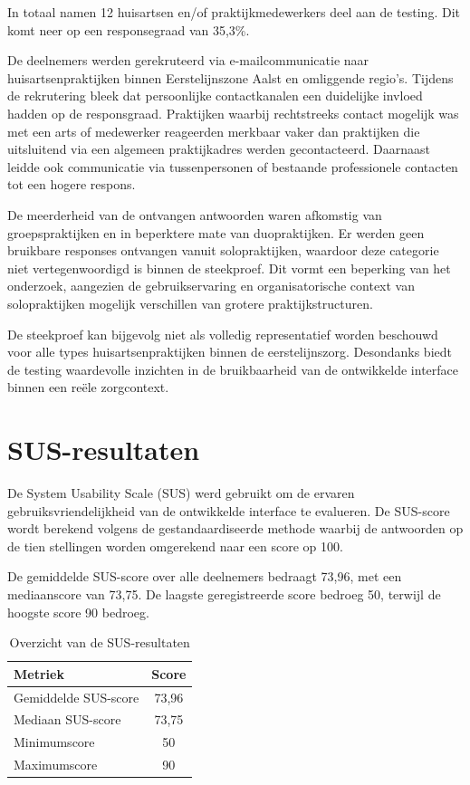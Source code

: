 In totaal namen 12 huisartsen en/of praktijkmedewerkers deel aan de testing. 
Dit komt neer op een responsegraad van 35,3\%.
\medskip

De deelnemers werden gerekruteerd via e-mailcommunicatie naar huisartsenpraktijken binnen Eerstelijnszone Aalst en omliggende regio's. 
Tijdens de rekrutering bleek dat persoonlijke contactkanalen een duidelijke invloed hadden op de responsgraad. 
Praktijken waarbij rechtstreeks contact mogelijk was met een arts of medewerker reageerden merkbaar vaker dan praktijken die uitsluitend via een algemeen praktijkadres werden gecontacteerd. 
Daarnaast leidde ook communicatie via tussenpersonen of bestaande professionele contacten tot een hogere respons.
\medskip

De meerderheid van de ontvangen antwoorden waren afkomstig van groepspraktijken en in beperktere mate van duopraktijken. 
Er werden geen bruikbare responses ontvangen vanuit solopraktijken, waardoor deze categorie niet vertegenwoordigd is binnen de steekproef. 
Dit vormt een beperking van het onderzoek, aangezien de gebruikservaring en organisatorische context van solopraktijken mogelijk verschillen van grotere praktijkstructuren.
\medskip

De steekproef kan bijgevolg niet als volledig representatief worden beschouwd voor alle types huisartsenpraktijken binnen de eerstelijnszorg. 
Desondanks biedt de testing waardevolle inzichten in de bruikbaarheid van de ontwikkelde interface binnen een reële zorgcontext.

\section{SUS-resultaten}
\label{sec:susresultaten}

De System Usability Scale (SUS) werd gebruikt om de ervaren gebruiksvriendelijkheid van de ontwikkelde interface te evalueren. 
De SUS-score wordt berekend volgens de gestandaardiseerde methode waarbij de antwoorden op de tien stellingen worden omgerekend naar een score op 100.
\medskip

De gemiddelde SUS-score over alle deelnemers bedraagt 73,96, met een mediaanscore van 73,75. 
De laagste geregistreerde score bedroeg 50, terwijl de hoogste score 90 bedroeg.

\begin{table}[H]
    \centering
    \begin{tabular}{|l|c|}
        \hline
        \textbf{Metriek} & \textbf{Score} \\
        \hline
        Gemiddelde SUS-score & 73,96 \\
        Mediaan SUS-score & 73,75 \\
        Minimumscore & 50 \\
        Maximumscore & 90 \\
        \hline
    \end{tabular}
    \caption{Overzicht van de SUS-resultaten}
    \label{tab:susresultaten}
\end{table}


